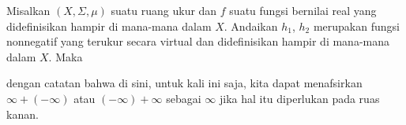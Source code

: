 Misalkan $(X,\Sigma,\mu)$ suatu ruang ukur dan $f$ suatu fungsi bernilai real
yang didefinisikan hampir di mana-mana dalam $X$. Andaikan $h_1$, $h_2$
merupakan fungsi nonnegatif yang terukur secara virtual dan didefinisikan
hampir di mana-mana dalam $X$. Maka


\noindent dengan catatan bahwa di sini, untuk kali ini saja, kita dapat
menafsirkan $\infty+(-\infty)$ atau $(-\infty)+\infty$ sebagai $\infty$
jika hal itu diperlukan pada ruas kanan.

